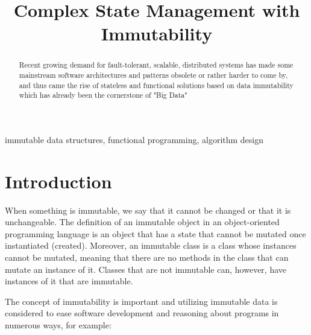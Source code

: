 \documentclass[conference]{IEEEtran}
\begin{document}
\title{Complex State Management with Immutability}

\author{
\and
{}
}

\maketitle



\begin{abstract}
    Recent growing demand for fault-tolerant, scalable, distributed systems has made some mainstream software architectures and patterns obsolete or rather harder to come by, and thus came the rise of stateless and functional solutions based on data immutability which has already been the cornerstone of "Big Data"

\end{abstract}

\begin{IEEEkeywords}
immutable data structures, functional programming, algorithm design
\end{IEEEkeywords}
\tableofcontents
\newpage
\section{Introduction}
When something is immutable, we say that it cannot be changed or that it is unchangeable. The definition
of an immutable object in an object-oriented programming language is an object that has a state
that cannot be mutated once instantiated (created). Moreover, an immutable class is a class whose instances
cannot be mutated, meaning that there are no methods in the class that can mutate an instance
of it. Classes that are not immutable can, however, have instances of it that are immutable. 

The concept of immutability is important and
utilizing immutable data is considered to ease software development and reasoning about programs in
numerous ways, for example:
\end{document}
